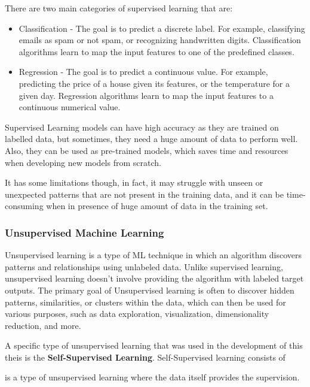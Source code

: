 There are two main categories of supervised learning that are:
\begin{itemize}
    \item Classification - The goal is to predict a discrete label. For example, classifying emails as spam or not spam, or recognizing handwritten digits. Classification algorithms learn to map the input features to one of the predefined classes.


    \item Regression - The goal is to predict a continuous value. For example, predicting the price of a house given its features, or the temperature for a given day. Regression algorithms learn to map the input features to a continuous numerical value.

\end{itemize}

Supervised Learning models can have high accuracy as they are trained on labelled data, but sometimes, they need a huge amount of data to perform well.
Also, they can be used as pre-trained models, which saves time and resources when developing new models from scratch.

It has some limitations though, in fact, it may struggle with unseen or unexpected patterns that are not present in the training data, and it can be time-consuming when in presence of huge amount of data in the training set.

\subsubsection{Unsupervised Machine Learning}
\label{subsubsec:unsupervised_ml}
Unsupervised learning is a type of ML technique in which an algorithm discovers patterns and relationships using unlabeled data.
Unlike supervised learning, unsupervised learning doesn’t involve providing the algorithm with labeled target outputs.
The primary goal of Unsupervised learning is often to discover hidden patterns, similarities, or clusters within the data, which can then be used for various purposes, such as data exploration, visualization, dimensionality reduction, and more.

A specific type of unsupervised learning that was used in the development of this theis is the \textbf{Self-Supervised Learning}.
Self-Supervised learning consists of

is a type of unsupervised learning where the data itself provides the supervision.


